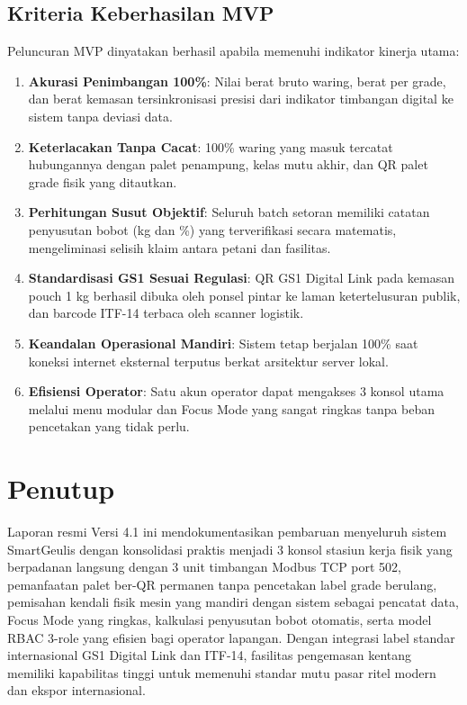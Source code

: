 \documentclass[12pt,a4paper]{article}
\begin{document}
\subsection{Kriteria Keberhasilan MVP}
Peluncuran MVP dinyatakan berhasil apabila memenuhi indikator kinerja utama:
\begin{enumerate}
  \item \textbf{Akurasi Penimbangan 100\%}: Nilai berat bruto waring, berat per grade, dan berat kemasan tersinkronisasi presisi dari indikator timbangan digital ke sistem tanpa deviasi data.
  \item \textbf{Keterlacakan Tanpa Cacat}: 100\% waring yang masuk tercatat hubungannya dengan palet penampung, kelas mutu akhir, dan QR palet grade fisik yang ditautkan.
  \item \textbf{Perhitungan Susut Objektif}: Seluruh batch setoran memiliki catatan penyusutan bobot (kg dan \%) yang terverifikasi secara matematis, mengeliminasi selisih klaim antara petani dan fasilitas.
  \item \textbf{Standardisasi GS1 Sesuai Regulasi}: QR GS1 Digital Link pada kemasan pouch 1 kg berhasil dibuka oleh ponsel pintar ke laman ketertelusuran publik, dan barcode ITF-14 terbaca oleh scanner logistik.
  \item \textbf{Keandalan Operasional Mandiri}: Sistem tetap berjalan 100\% saat koneksi internet eksternal terputus berkat arsitektur server lokal.
  \item \textbf{Efisiensi Operator}: Satu akun operator dapat mengakses 3 konsol utama melalui menu modular dan Focus Mode yang sangat ringkas tanpa beban pencetakan yang tidak perlu.
\end{enumerate}

\section{Penutup}

Laporan resmi Versi 4.1 ini mendokumentasikan pembaruan menyeluruh sistem SmartGeulis dengan konsolidasi praktis menjadi 3 konsol stasiun kerja fisik yang berpadanan langsung dengan 3 unit timbangan Modbus TCP port 502, pemanfaatan palet ber-QR permanen tanpa pencetakan label grade berulang, pemisahan kendali fisik mesin yang mandiri dengan sistem sebagai pencatat data, Focus Mode yang ringkas, kalkulasi penyusutan bobot otomatis, serta model RBAC 3-role yang efisien bagi operator lapangan. Dengan integrasi label standar internasional GS1 Digital Link dan ITF-14, fasilitas pengemasan kentang memiliki kapabilitas tinggi untuk memenuhi standar mutu pasar ritel modern dan ekspor internasional.
\end{document}
